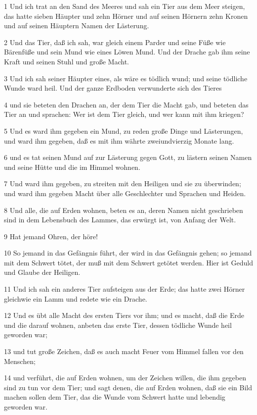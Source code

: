 \par 1 Und ich trat an den Sand des Meeres und sah ein Tier aus dem Meer steigen, das hatte sieben Häupter und zehn Hörner und auf seinen Hörnern zehn Kronen und auf seinen Häuptern Namen der Lästerung.
\par 2 Und das Tier, daß ich sah, war gleich einem Parder und seine Füße wie Bärenfüße und sein Mund wie eines Löwen Mund. Und der Drache gab ihm seine Kraft und seinen Stuhl und große Macht.
\par 3 Und ich sah seiner Häupter eines, als wäre es tödlich wund; und seine tödliche Wunde ward heil. Und der ganze Erdboden verwunderte sich des Tieres
\par 4 und sie beteten den Drachen an, der dem Tier die Macht gab, und beteten das Tier an und sprachen: Wer ist dem Tier gleich, und wer kann mit ihm kriegen?
\par 5 Und es ward ihm gegeben ein Mund, zu reden große Dinge und Lästerungen, und ward ihm gegeben, daß es mit ihm währte zweiundvierzig Monate lang.
\par 6 und es tat seinen Mund auf zur Lästerung gegen Gott, zu lästern seinen Namen und seine Hütte und die im Himmel wohnen.
\par 7 Und ward ihm gegeben, zu streiten mit den Heiligen und sie zu überwinden; und ward ihm gegeben Macht über alle Geschlechter und Sprachen und Heiden.
\par 8 Und alle, die auf Erden wohnen, beten es an, deren Namen nicht geschrieben sind in dem Lebensbuch des Lammes, das erwürgt ist, von Anfang der Welt.
\par 9 Hat jemand Ohren, der höre!
\par 10 So jemand in das Gefängnis führt, der wird in das Gefängnis gehen; so jemand mit dem Schwert tötet, der muß mit dem Schwert getötet werden. Hier ist Geduld und Glaube der Heiligen.
\par 11 Und ich sah ein anderes Tier aufsteigen aus der Erde; das hatte zwei Hörner gleichwie ein Lamm und redete wie ein Drache.
\par 12 Und es übt alle Macht des ersten Tiers vor ihm; und es macht, daß die Erde und die darauf wohnen, anbeten das erste Tier, dessen tödliche Wunde heil geworden war;
\par 13 und tut große Zeichen, daß es auch macht Feuer vom Himmel fallen vor den Menschen;
\par 14 und verführt, die auf Erden wohnen, um der Zeichen willen, die ihm gegeben sind zu tun vor dem Tier; und sagt denen, die auf Erden wohnen, daß sie ein Bild machen sollen dem Tier, das die Wunde vom Schwert hatte und lebendig geworden war.
